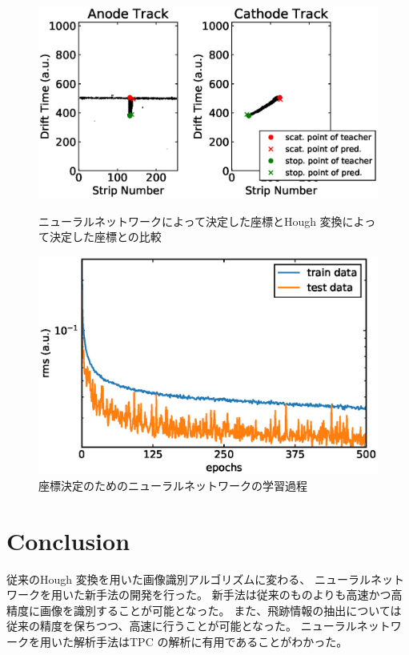 \documentclass{jps-cp}
\begin{document}
\begin{figure}
  \centering
  \begin{minipage}{0.45\columnwidth}
    \centering
    \includegraphics[clip,width=0.9\columnwidth]{eps/point_detection_compair.eps}
    \caption{ニューラルネットワークによって決定した座標とHough 変換によって決定した座標との比較}
    \label{fig:result_detection}
  \end{minipage}
  \hfill
  \begin{minipage}{0.45\columnwidth}
    \centering
    \includegraphics[clip,width=0.9\columnwidth]{eps/point_detection_history.eps}
    \caption{座標決定のためのニューラルネットワークの学習過程}
    \label{fig:history_detection}
  \end{minipage}
\end{figure}

\section{Conclusion}
従来のHough 変換を用いた画像識別アルゴリズムに変わる、
ニューラルネットワークを用いた新手法の開発を行った。
新手法は従来のものよりも高速かつ高精度に画像を識別することが可能となった。
また、飛跡情報の抽出については従来の精度を保ちつつ、高速に行うことが可能となった。
ニューラルネットワークを用いた解析手法はTPC の解析に有用であることがわかった。
\end{document}
